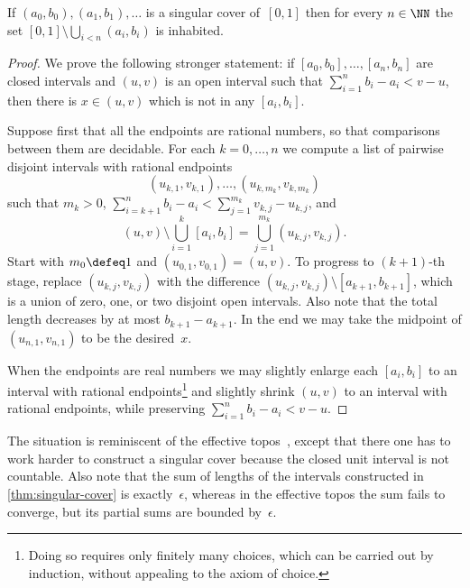 \begin{theoremC}
  \label{thm:singular-cover}%
  If $(a_0, b_0), (a_1, b_1), \ldots$ is a singular cover of~$[0,1]$ then for every $n \in \NN$ the set $[0,1] \setminus \bigcup_{i < n} (a_i, b_i)$ is inhabited.
\end{theoremC}

\begin{proof}
  We prove the following stronger statement:
  if $[a_0, b_0], \ldots, [a_n, b_n]$ are closed intervals and $(u, v)$ is an open interval such that $\sum_{i=1}^n b_i - a_i < v - u$, then there is $x \in (u, v)$ which is not in any $[a_i, b_i]$.

  Suppose first that all the endpoints are rational numbers, so that comparisons between them are decidable.
  For each $k = 0, \ldots, n$ we compute a list of pairwise disjoint intervals with rational endpoints
  \begin{equation*}
    (u_{k,1}, v_{k,1}), \ldots, (u_{k, m_k}, v_{k, m_k})
  \end{equation*}
  such that $m_k > 0$, $\sum_{i=k+1}^n b_i - a_i < \sum_{j=1}^{m_k} v_{k,j} - u_{k,j}$, and
  \begin{equation*}
    \textstyle
    (u, v) \setminus \bigcup_{i=1}^k [a_i, b_i] = \bigcup_{j=1}^{m_k} (u_{k,j}, v_{k,j}).
  \end{equation*}
  Start with $m_0 \defeq 1$ and $(u_{0,1}, v_{0,1}) = (u, v)$.
  To progress to $(k+1)$-th stage, replace $(u_{k,j}, v_{k,j})$ with the difference $(u_{k,j}, v_{k,j}) \setminus [a_{k+1}, b_{k+1}]$, which is a union of zero, one, or two disjoint open intervals.
  Also note that the total length decreases by at most $b_{k+1} - a_{k+1}$.
  In the end we may take the midpoint of $(u_{n,1}, v_{n,1})$ to be the desired~$x$.

  When the endpoints are real numbers we may slightly enlarge each $[a_i, b_i]$ to an interval with rational endpoints\footnote{Doing so requires only finitely many choices, which can be carried out by induction, without appealing to the axiom of choice.} and slightly shrink $(u,v)$ to an interval with rational endpoints, while preserving
  $\sum_{i=1}^n b_i - a_i < v - u$.
\end{proof}

The situation is reminiscent of the effective topos~\cite[Sect.~6.4.2]{troelstra88:_const_mathem}, except that there one has to work harder to construct a singular cover because the closed unit interval is not countable. Also note that the sum of lengths of the intervals constructed in \cref{thm:singular-cover} is exactly~$\epsilon$, whereas in the effective topos the sum fails to converge, but its partial sums are bounded by~$\epsilon$.

